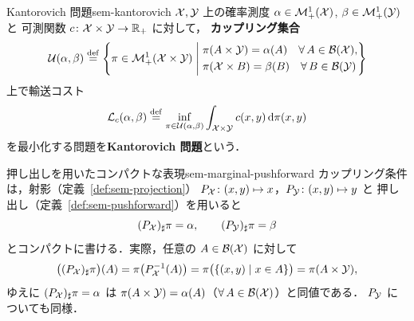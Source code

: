 \begin{definition}{Kantorovich 問題}{sem-kantorovich}
  $\mathcal{X}, \mathcal{Y}$ 上の確率測度 $\alpha \in \mathcal{M}_+^1(\mathcal{X})$, $\beta \in \mathcal{M}_+^1(\mathcal{Y})$ と
  可測関数 $c \colon \mathcal{X} \times \mathcal{Y} \to \mathbb{R}_+$ に対して，
  \textbf{カップリング集合}
  \[
    \mathcal{U}(\alpha, \beta) \overset{\mathrm{def}}{=}
    \left\{ \pi \in \mathcal{M}_+^1(\mathcal{X} \times \mathcal{Y}) \;\middle|\;
      \begin{aligned}
        &\pi(A \times \mathcal{Y}) = \alpha(A) \quad \forall\, A \in \mathcal{B}(\mathcal{X}), \\
        &\pi(\mathcal{X} \times B) = \beta(B)  \quad \forall\, B \in \mathcal{B}(\mathcal{Y})
      \end{aligned}
    \right\}
  \]
  上で輸送コスト
  \[
    \mathcal{L}_c(\alpha, \beta) \overset{\mathrm{def}}{=}
    \inf_{\pi \in \mathcal{U}(\alpha, \beta)}
    \int_{\mathcal{X} \times \mathcal{Y}} c(x, y) \, \mathrm{d}\pi(x, y)
  \]
  を最小化する問題を\textbf{Kantorovich 問題}という．
\end{definition}

\begin{remark}{押し出しを用いたコンパクトな表現}{sem-marginal-pushforward}
  カップリング条件は，射影（定義~\ref{def:sem-projection}）
  $P_{\mathcal{X}} \colon (x,y) \mapsto x$，$P_{\mathcal{Y}} \colon (x,y) \mapsto y$ と
  押し出し（定義~\ref{def:sem-pushforward}）を用いると
  \[
    (P_{\mathcal{X}})_\sharp \pi = \alpha, \qquad (P_{\mathcal{Y}})_\sharp \pi = \beta
  \]
  とコンパクトに書ける．実際，任意の $A \in \mathcal{B}(\mathcal{X})$ に対して
  \[
    \bigl((P_{\mathcal{X}})_\sharp \pi\bigr)(A)
    = \pi\bigl(P_{\mathcal{X}}^{-1}(A)\bigr)
    = \pi\bigl(\{(x,y) \mid x \in A\}\bigr)
    = \pi(A \times \mathcal{Y}),
  \]
  ゆえに $(P_{\mathcal{X}})_\sharp \pi = \alpha$ は
  $\pi(A \times \mathcal{Y}) = \alpha(A)$（$\forall\, A \in \mathcal{B}(\mathcal{X})$）と同値である．
  $P_{\mathcal{Y}}$ についても同様．
\end{remark}

